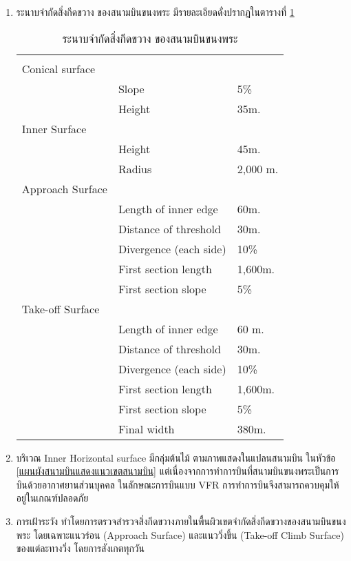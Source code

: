 \begin{enumerate}
\item ระนาบจำกัดสิ่งกีดขวาง ของสนามบินขนงพระ มีรายละเอียดดั่งปรากฏในตารางที่ \ref{ระนาบจํากัดสิ่งกีดขวาง ของสนามบินขนงพระ}

\begin{table}[h!]
\caption{ระนาบจํากัดสิ่งกีดขวาง ของสนามบินขนงพระ}
\begin{center}
\begin{tabular}{lll}
& & \\
Conical surface	& & \\
 & Slope & 5\% \\
 & Height & 35m. \\
Inner Surface & & \\
 & Height & 45m. \\
 & Radius & 2,000 m. \\
Approach Surface & & \\
 & Length of inner edge & 60m. \\
 & Distance of threshold & 30m. \\
 & Divergence (each side)	& 10\% \\
 & First section length & 1,600m. \\
 & First section slope	 & 5\% \\
Take-off Surface & & \\
 & Length of inner edge & 60 m. \\	
 & Distance of threshold & 30m. \\
 & Divergence (each side) & 10\% \\
 & First section length & 1,600m. \\
 & First section slope	 & 5\% \\
 & Final width & 380m. \\
\end{tabular}
\end{center}
\label{ระนาบจํากัดสิ่งกีดขวาง ของสนามบินขนงพระ}
\end{table}%

\item บริเวณ Inner Horizontal surface มีกลุ่มต้นไม้ ตามภาพแสดงในแปลนสนามบิน ในหัวข้อ \ref{แผนผังสนามบินแสดงแนวเขตสนามบิน} แต่เนื่องจากการทำการบินที่สนามบินขนงพระเป็นการบินด้วยอากาศยานส่วนบุคคล ในลักษณะการบินแบบ VFR   การทำการบินจึงสามารถควบคุมให้อยู่ในเกณฑ์ปลอดภัย
\item การเฝ้าระวัง ทำโดยการตรวจสำรวจสิ่งกีดขวางภายในพื้นผิวเขตจำกัดสิ่งกีดขวางของสนามบินขนงพระ โดยเฉพาะแนวร่อน (Approach Surface)  และแนววิ่งขึ้น (Take-off Climb Surface) ของแต่ละทางวิ่ง โดยการสังเกตทุกวัน
\end{enumerate}

